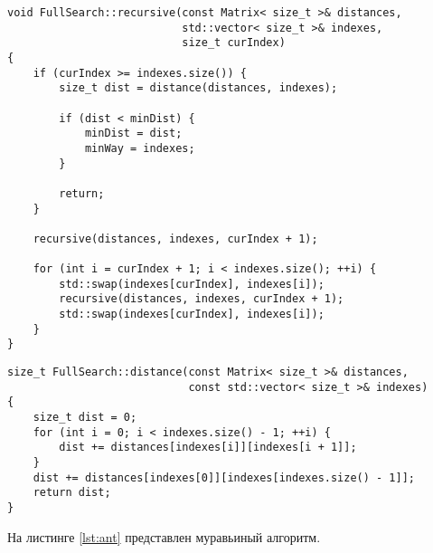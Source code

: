 \begin{lstlisting}[caption=Алгоритм рекурсивного перебора,label=lst:full]
void FullSearch::recursive(const Matrix< size_t >& distances,
                           std::vector< size_t >& indexes,
                           size_t curIndex)
{
    if (curIndex >= indexes.size()) {
        size_t dist = distance(distances, indexes);

        if (dist < minDist) {
            minDist = dist;
            minWay = indexes;
        }

        return;
    }

    recursive(distances, indexes, curIndex + 1);

    for (int i = curIndex + 1; i < indexes.size(); ++i) {
        std::swap(indexes[curIndex], indexes[i]);
        recursive(distances, indexes, curIndex + 1);
        std::swap(indexes[curIndex], indexes[i]);
    }
}
\end{lstlisting}

\begin{lstlisting}[caption=Подсчет пути,label=lst:dist]
size_t FullSearch::distance(const Matrix< size_t >& distances,
                            const std::vector< size_t >& indexes)
{
    size_t dist = 0;
    for (int i = 0; i < indexes.size() - 1; ++i) {
        dist += distances[indexes[i]][indexes[i + 1]];
    }
    dist += distances[indexes[0]][indexes[indexes.size() - 1]];
    return dist;
}
\end{lstlisting}

На листинге \ref{lst:ant} представлен муравьиный алгоритм.

